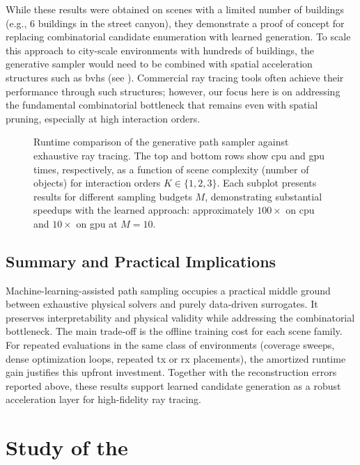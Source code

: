 While these results were obtained on scenes with a limited number of buildings (e.g., 6 buildings in the street canyon), they demonstrate a proof of concept for replacing combinatorial candidate enumeration with learned generation. To scale this approach to city-scale environments with hundreds of buildings, the generative sampler would need to be combined with spatial acceleration structures such as \glspl{bvh} (see ). Commercial ray tracing tools often achieve their performance through such structures; however, our focus here is on addressing the fundamental combinatorial bottleneck that remains even with spatial pruning, especially at high interaction orders.

\begin{figure}
  \centering
  \caption{Runtime comparison of the generative path sampler against exhaustive ray tracing. The top and bottom rows show \gls{cpu} and \gls{gpu} times, respectively, as a function of scene complexity (number of objects) for interaction orders $K \in \{1, 2, 3\}$. Each subplot presents results for different sampling budgets $M$, demonstrating substantial speedups with the learned approach: approximately $100\times$ on \gls{cpu} and $10\times$ on \gls{gpu} at $M=10$.}
\end{figure}

\subsection{Summary and Practical Implications}

Machine-learning-assisted path sampling occupies a practical middle ground between exhaustive physical solvers and purely data-driven surrogates. It preserves interpretability and physical validity while addressing the combinatorial bottleneck. The main trade-off is the offline training cost for each scene family. For repeated evaluations in the same class of environments (coverage sweeps, dense optimization loops, repeated \gls{tx} or \gls{rx} placements), the amortized runtime gain justifies this upfront investment. Together with the reconstruction errors reported above, these results support learned candidate generation as a robust acceleration layer for high-fidelity ray tracing.

\section{Study of the \texorpdfstring{}{Multipath Lifetime Map}}

